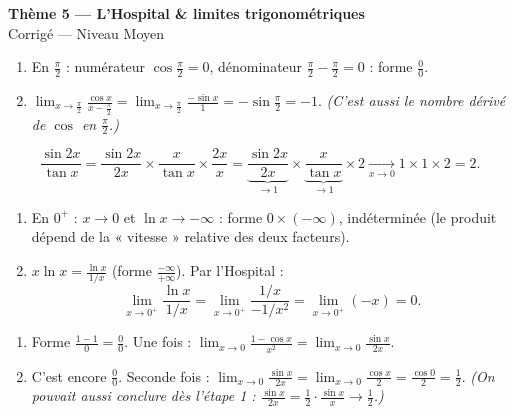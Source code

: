 \documentclass[11pt,a4paper]{article}
\begin{document}
\begin{center}
{\Large\bfseries\color{primarydark}Thème 5 — L'Hospital \& limites trigonométriques}\\[2pt]
{\large\color{excol}Corrigé — Niveau Moyen}
\end{center}
\vspace{6pt}

\begin{correction}
\begin{enumerate}[label=\alph*),leftmargin=2em,itemsep=3pt]
  \item En $\frac{\pi}{2}$ : numérateur $\cos\frac{\pi}{2}=0$, dénominateur $\frac{\pi}{2}-\frac{\pi}{2}=0$ : forme $\frac00$.
  \item $\displaystyle\lim_{x\to \frac{\pi}{2}}\frac{\cos x}{x-\frac{\pi}{2}}=\lim_{x\to\frac{\pi}{2}}\frac{-\sin x}{1}=-\sin\frac{\pi}{2}=-1$.
        \emph{(C'est aussi le nombre dérivé de $\cos$ en $\frac{\pi}{2}$.)}
\end{enumerate}
\end{correction}

\begin{correction}
\[ \frac{\sin 2x}{\tan x}=\frac{\sin 2x}{2x}\times\frac{x}{\tan x}\times\frac{2x}{x}
   =\underbrace{\frac{\sin 2x}{2x}}_{\to 1}\times\underbrace{\frac{x}{\tan x}}_{\to 1}\times 2
   \xrightarrow[x\to0]{}1\times 1\times 2=2. \]
\end{correction}

\begin{correction}
\begin{enumerate}[label=\alph*),leftmargin=2em,itemsep=3pt]
  \item En $0^{+}$ : $x\to 0$ et $\ln x\to-\infty$ : forme $0\times(-\infty)$, indéterminée (le produit
        dépend de la « vitesse » relative des deux facteurs).
  \item $\displaystyle x\ln x=\frac{\ln x}{1/x}$ (forme $\frac{-\infty}{+\infty}$). Par l'Hospital :
        \[ \lim_{x\to 0^{+}}\frac{\ln x}{1/x}=\lim_{x\to 0^{+}}\frac{1/x}{-1/x^2}=\lim_{x\to 0^{+}}(-x)=0. \]
\end{enumerate}
\end{correction}

\begin{correction}
\begin{enumerate}[label=\alph*),leftmargin=2em,itemsep=3pt]
  \item Forme $\frac{1-1}{0}=\frac00$. Une fois : $\displaystyle\lim_{x\to 0}\frac{1-\cos x}{x^2}=\lim_{x\to 0}\frac{\sin x}{2x}$.
  \item C'est encore $\frac00$. Seconde fois : $\displaystyle\lim_{x\to 0}\frac{\sin x}{2x}=\lim_{x\to 0}\frac{\cos x}{2}=\frac{\cos 0}{2}=\frac12$.
        \emph{(On pouvait aussi conclure dès l'étape 1 : $\frac{\sin x}{2x}=\frac12\cdot\frac{\sin x}{x}\to\frac12$.)}
\end{enumerate}
\end{correction}
\end{document}
